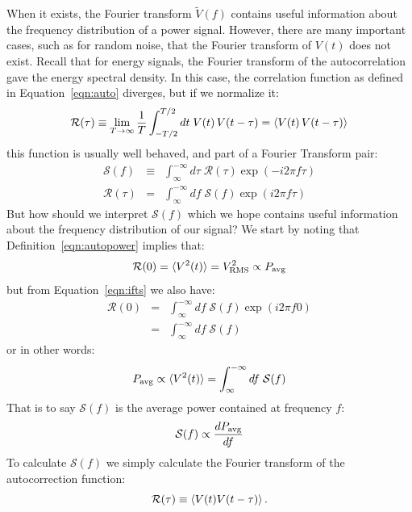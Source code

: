 \documentclass[12pt,oneside]{book}
\begin{document}
When it exists, the Fourier transform $\widetilde{V}(f)$ contains useful information about the frequency distribution of a power signal.  However, there are many important cases, such as for random noise, that the Fourier transform of $V(t)$ does not exist.  Recall that for energy signals, the Fourier transform of the autocorrelation gave the energy spectral density.  In this case, the correlation function as defined in Equation~\ref{eqn:auto} diverges, but if we normalize it:
\begin{equation}
\mathcal{R}(\tau) \equiv \lim_{T \to \infty } \frac{1}{T} \int_{-T/2}^{T/2} dt \; V(t) \, V(t-\tau) = \braket{V(t) \, V(t-\tau)}
\label{eqn:autopower}
\end{equation}
this function is usually well behaved, and part of a Fourier Transform pair:
\begin{eqnarray}
\mathcal{S}(f) &\equiv& \int_{\infty}^{-\infty} d\tau \; \mathcal{R}(\tau) \exp(-i2\pi f \tau) \\ 
\mathcal{R}(\tau) &=& \int_{\infty}^{-\infty} df \; \mathcal{S}(f) \exp(i2\pi f \tau)  \label{eqn:ifts}
\end{eqnarray}
But how should we interpret $\mathcal{S}(f)$ which we hope contains useful information about the frequency distribution of our signal?  We start by noting that Definition~\ref{eqn:autopower} implies
that:
\begin{displaymath}
\mathcal{R}(0) = \braket{V^2(t)} = V^2_{\rm RMS} \propto P_{\rm avg}
\end{displaymath}
but from Equation~\ref{eqn:ifts} we also have:
\begin{eqnarray*}
\mathcal{R}(0) &=& \int_{\infty}^{-\infty} df \; \mathcal{S}(f) \exp(i2\pi f 0) \\
        &=& \int_{\infty}^{-\infty} df \; \mathcal{S}(f)
\end{eqnarray*}
or in other words:
\begin{displaymath}
P_{\rm avg} \propto  \braket{V^2(t)} = \int_{\infty}^{-\infty} df \; \mathcal{S}(f) 
\end{displaymath}
That is to say $\mathcal{S}(f)$ is the average power contained at frequency $f$:
\begin{displaymath}
\mathcal{S}(f) \propto \frac{dP_{\rm avg}}{df}
\end{displaymath}
 To calculate $\mathcal{S}(f)$ we simply calculate the Fourier transform of the autocorrection function:
\begin{equation}
\mathcal{R}(\tau) \equiv \braket{V(t) V(t-\tau)}.
\end{equation}
\end{document}
